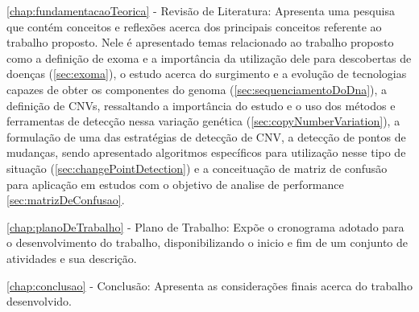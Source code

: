 \autoref{chap:fundamentacaoTeorica} - Revisão de Literatura: Apresenta uma pesquisa que contém conceitos e reflexões acerca dos principais conceitos referente ao trabalho proposto. Nele é apresentado temas relacionado ao trabalho proposto como a definição de exoma e a importância da utilização dele para descobertas de doenças (\autoref{sec:exoma}), o estudo acerca do surgimento e a evolução de tecnologias capazes de obter os componentes do genoma (\autoref{sec:sequenciamentoDoDna}), a definição de CNVs, ressaltando a importância do estudo e o uso dos métodos e ferramentas de detecção nessa variação genética (\autoref{sec:copyNumberVariation}), a formulação de uma das estratégias de detecção de CNV, a detecção de pontos de mudanças, sendo apresentado algoritmos específicos para utilização nesse tipo de situação (\autoref{sec:changePointDetection}) e a conceituação de matriz de confusão para aplicação em estudos com o objetivo de analise de performance \autoref{sec:matrizDeConfusao}.

\autoref{chap:planoDeTrabalho} - Plano de Trabalho: Expõe o cronograma adotado para o desenvolvimento do trabalho, disponibilizando o inicio e fim de um conjunto de atividades e sua descrição.

\autoref{chap:conclusao} - Conclusão: Apresenta as considerações finais acerca do trabalho desenvolvido.
